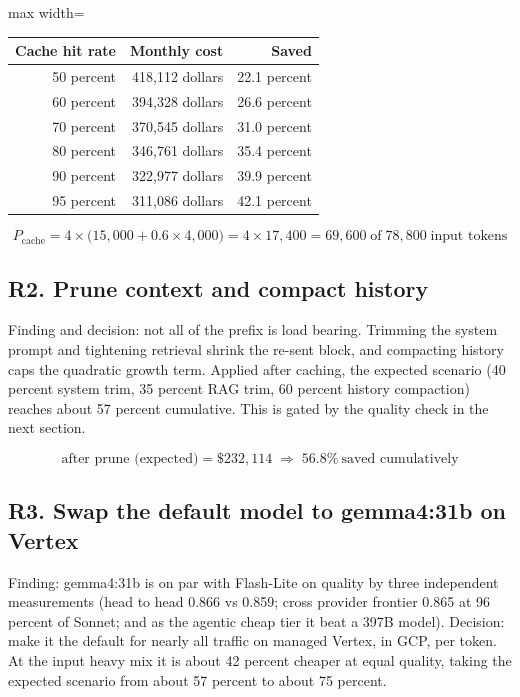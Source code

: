 \documentclass[11pt]{uce-report}
\begin{document}
\vspace{0.4em}
\noindent\begin{adjustbox}{max width=\linewidth}\begin{tabular}{rrr}
\toprule
\textbf{Cache hit rate} & \textbf{Monthly cost} & \textbf{Saved} \\
\midrule
50 percent & 418,112 dollars & 22.1 percent \\
60 percent & 394,328 dollars & 26.6 percent \\
70 percent & 370,545 dollars & 31.0 percent \\
80 percent & 346,761 dollars & 35.4 percent \\
90 percent & 322,977 dollars & 39.9 percent \\
95 percent & 311,086 dollars & 42.1 percent \\
\bottomrule
\end{tabular}\end{adjustbox}

\[P_{\text{cache}} = 4 \times \big(15{,}000 + 0.6 \times 4{,}000\big) = 4 \times 17{,}400 = 69{,}600 \;\text{of}\; 78{,}800 \;\text{input tokens}\]
\subsection{R2. Prune context and compact history}
Finding and decision: not all of the prefix is load bearing. Trimming the system prompt and tightening retrieval shrink the re-sent block, and compacting history caps the quadratic growth term. Applied after caching, the expected scenario (40 percent system trim, 35 percent RAG trim, 60 percent history compaction) reaches about 57 percent cumulative. This is gated by the quality check in the next section.


\[\text{after prune (expected)} = \$232{,}114 \;\Rightarrow\; 56.8\%\ \text{saved cumulatively}\]
\subsection{R3. Swap the default model to gemma4:31b on Vertex}
Finding: gemma4:31b is on par with Flash-Lite on quality by three independent measurements (head to head 0.866 vs 0.859; cross provider frontier 0.865 at 96 percent of Sonnet; and as the agentic cheap tier it beat a 397B model). Decision: make it the default for nearly all traffic on managed Vertex, in GCP, per token. At the input heavy mix it is about 42 percent cheaper at equal quality, taking the expected scenario from about 57 percent to about 75 percent.
\end{document}
